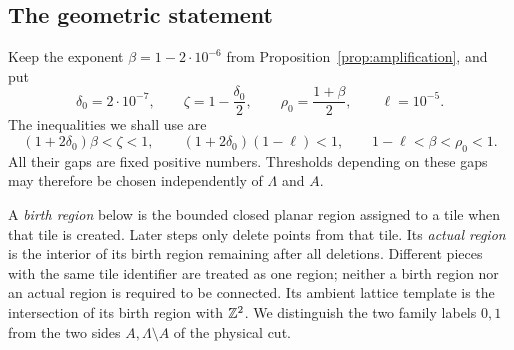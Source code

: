 \subsection{The geometric statement}

Keep the exponent $\beta=1-2\cdot10^{-6}$ from
Proposition~\ref{prop:amplification}, and put
\begin{equation}
\label{geometry:exponents}
 \delta_0=2\cdot10^{-7},\qquad
 \zeta=1-\frac{\delta_0}{2},\qquad
 \rho_0=\frac{1+\beta}{2},\qquad
 \ell=10^{-5}.
\end{equation}
The inequalities we shall use are
\begin{equation}
\label{geometry:exponent-gaps}
 (1+2\delta_0)\beta<\zeta<1,\qquad
 (1+2\delta_0)(1-\ell)<1,\qquad
 1-\ell<\beta<\rho_0<1.
\end{equation}
All their gaps are fixed positive numbers.  Thresholds depending on these
gaps may therefore be chosen independently of $\Lambda$ and $A$.

A \emph{birth region} below is the bounded closed planar region assigned
to a tile when that tile is created.  Later steps only delete points from
that tile.  Its \emph{actual region} is the interior of its birth region remaining
after all deletions.  Different pieces with the same tile identifier are treated as
one region; neither a birth region nor an actual region is required to be
connected.  Its ambient lattice template is the intersection of its birth
region with $\mathbb Z^2$.  We distinguish the two family labels $0,1$ from the
two sides $A,\Lambda\setminus A$ of the physical cut.

